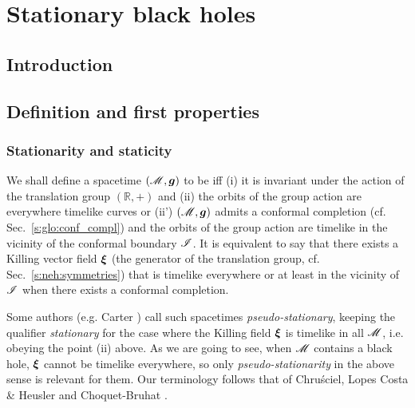 \chapter{Stationary black holes}
\label{s:sta}

\minitoc

\section{Introduction}

\section{Definition and first properties}

\subsection{Stationarity and staticity} \label{s:sta:def_station}

We shall define a spacetime
$(\mathscr{M},\bm{g})$ to be 
iff (i) it is invariant under
the action of the translation group $(\mathbb{R},+)$ and (ii) the orbits of
the group action are everywhere timelike curves or (ii') $(\mathscr{M},\bm{g})$
admits a conformal completion (cf. Sec.~\ref{s:glo:conf_compl})
and the orbits of the group action are timelike in the vicinity of
the conformal boundary $\mathscr{I}$.
It is equivalent to say that there exists a Killing vector field
$\bm{\xi}$ (the generator of the translation group, cf. Sec.~\ref{s:neh:symmetries}) that is
timelike everywhere or at least in the vicinity of $\mathscr{I}$ when there exists a conformal
completion.

\begin{remark} \label{r:sta:pseudo-stationary}
Some authors (e.g. Carter \cite{Carte73b}) call such spacetimes
\emph{pseudo-stationary}, keeping the qualifier
\emph{stationary} for the case where the Killing field $\bm{\xi}$ is timelike
in all $\mathscr{M}$, i.e. obeying the point (ii) above. As we are going to see, when $\mathscr{M}$
contains a black hole, $\bm{\xi}$ cannot be timelike everywhere,
so only \emph{pseudo-stationarity} in the above sense is relevant for them.
Our terminology follows that of Chru\'sciel, Lopes Costa \& Heusler \cite{ChrusLH12}
and Choquet-Bruhat \cite{Choqu09}.
\end{remark}

